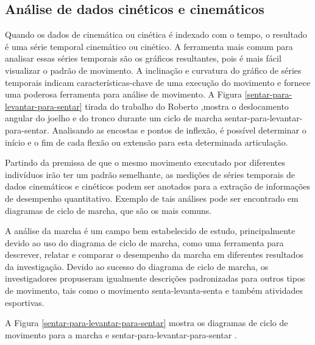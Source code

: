 \subsection{Análise de dados cinéticos e cinemáticos}
Quando os dados de cinemática ou cinética é indexado com o tempo, o resultado é uma série temporal cinemático
 ou cinético. A ferramenta mais comum para analisar essas séries temporais são os
gráficos resultantes, pois é mais fácil visualizar o padrão de movimento. A inclinação e
curvatura do gráfico de séries temporais indicam características-chave de uma
 execução do movimento e fornece uma poderosa ferramenta para análise de movimento.
A Figura \ref{sentar-para-levantar-para-sentar} tirada do trabalho do Roberto \cite{roberto},mostra o deslocamento angular do
joelho e do tronco durante um ciclo de marcha sentar-para-levantar-para-sentar. Analisando as encostas e pontos de inflexão, é
possível determinar o início e o fim de cada flexão ou extensão para esta determinada
articulação.

Partindo da premissa de que o mesmo movimento executado por diferentes indivíduos irão
ter um padrão semelhante, as medições de séries temporais de dados cinemáticos e
 cinéticos podem ser anotados para a extração de informações de
desempenho quantitativo. Exemplo de tais análises pode ser encontrado em diagramas de ciclo de marcha, que são os mais comuns.

A análise da marcha é um campo bem estabelecido de estudo, principalmente devido
ao uso do diagrama de ciclo de marcha, como uma ferramenta para descrever,
relatar e comparar o desempenho da marcha em diferentes resultados da investigação.
Devido ao sucesso do diagrama de ciclo de marcha, os investigadores propuseram igualmente descrições padronizadas para
outros tipos de movimento, tais como o movimento senta-levanta-senta e também atividades esportivas.

A Figura \ref{sentar-para-levantar-para-sentar} mostra os diagramas de ciclo de movimento para a marcha e sentar-para-levantar-para-sentar .

